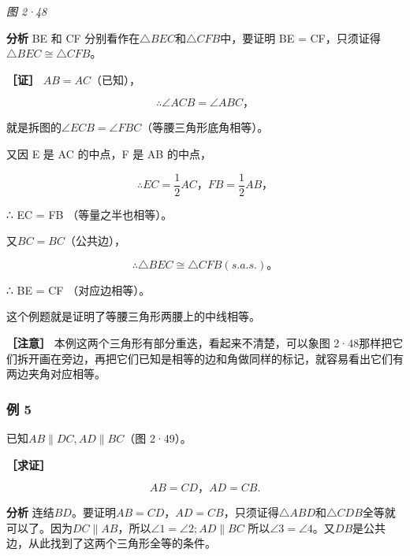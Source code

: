 \emph{图 2·48}

\textbf{分析} BE 和 CF
分别看作在\(\triangle BEC\)和\(\triangle CFB\)中，要证明 BE =
CF，只须证得\(\triangle BEC \cong \triangle CFB\)。

\textbf{［证］} \(AB = AC\)（已知），

\[
\therefore \angle ACB = \angle ABC\text{，}
\]

就是拆图的\(\angle ECB = \angle FBC\)（等腰三角形底角相等）。

又因 E 是 AC 的中点，F 是 AB 的中点，

\[
\therefore EC = \frac{1}{2} AC\text{，} FB = \frac{1}{2} AB\text{，}
\]

∴ EC = FB （等量之半也相等）。

又\(BC = BC\)（公共边），

\[
\therefore \triangle BEC \cong \triangle CFB (s. a. s.)\text{。}
\]

∴ BE = CF （对应边相等）。

这个例题就是证明了等腰三角形两腰上的中线相等。

\textbf{［注意］} 本例这两个三角形有部分重迭，看起来不清楚，可以象图
2·48那样把它们拆开画在旁边，再把它们已知是相等的边和角做同样的标记，就容易看出它们有两边夹角对应相等。

\subsubsection{例 5}

已知\(AB \parallel DC, AD \parallel BC\)（图 2·49）。

\textbf{［求证］}

\[
AB = CD\text{，} AD = CB.
\]

\textbf{分析}
连结\(BD\)。要证明\(AB = CD\)，\(AD = CB\)，只须证得\(\triangle ABD\)和\(\triangle CDB\)全等就可以了。因为\(DC \parallel AB\)，所以\(\angle 1 = \angle 2; AD \parallel BC\)
所以\(\angle 3 = \angle 4\)。又\(DB\)是公共边，从此找到了这两个三角形全等的条件。

